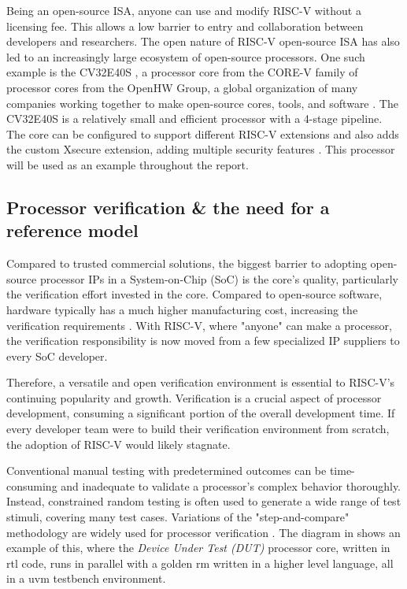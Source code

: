 Being an open-source ISA, anyone can use and modify RISC-V without a licensing fee. This allows a low barrier to entry and collaboration between developers and researchers. The open nature of RISC-V open-source ISA has also led to an increasingly large ecosystem of open-source processors. One such example is the CV32E40S \cite{OpenhwgroupCv32e40s2024}, a processor core from the CORE-V family of processor cores from the OpenHW Group, a global organization of many companies working together to make open-source cores, tools, and software \cite{taylorAdvancedRISCVVerification2023}. The CV32E40S is a relatively small and efficient processor with a 4-stage pipeline. The core can be configured to support different RISC-V extensions and also adds the custom Xsecure extension, adding multiple security features \cite{openhwgroupIntroductionCOREVCV32E40S2023}. This processor will be used as an example throughout the report.





\subsection{Processor verification \& the need for a reference model}

Compared to trusted commercial solutions, the biggest barrier to adopting open-source processor IPs in a System-on-Chip (SoC) is the core's quality, particularly the verification effort invested in the core. Compared to open-source software, hardware typically has a much higher manufacturing cost, increasing the verification requirements \cite{kevinmcdermottOpenHWIndustrialGradeVerification2022}.
With RISC-V, where "anyone" can make a processor, the verification responsibility is now moved from a few specialized IP suppliers to every SoC developer. 

Therefore, a versatile and open verification environment is essential to RISC-V's continuing popularity and growth. Verification is a crucial aspect of processor development, consuming a significant portion of the overall development time. If every developer team were to build their verification environment from scratch, the adoption of RISC-V would likely stagnate.

Conventional manual testing with predetermined outcomes can be time-consuming and inadequate to validate a processor's complex behavior thoroughly. Instead, constrained random testing is often used to generate a wide range of test stimuli, covering many test cases. Variations of the "step-and-compare" methodology are widely used for processor verification \cite{taylorAdvancedRISCVVerification2023}. The diagram in  shows an example of this, where the \textit{Device Under Test (DUT)} processor core, written in \acrfull{rtl} code, runs in parallel with a golden \gls{rm} written in a higher level language, all in a \acrfull{uvm} testbench environment. 

